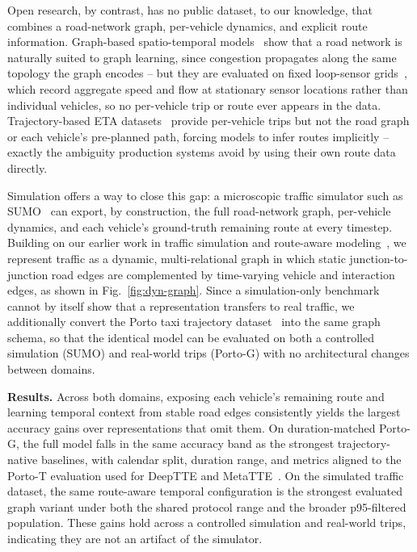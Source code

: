 Open research, by contrast, has no public dataset, to our knowledge, that combines a road-network graph, per-vehicle dynamics, and explicit route information. Graph-based spatio-temporal models~\cite{dcrnn2018,yu2018stgcn,wu2019graphwavenet} show that a road network is naturally suited to graph learning, since congestion propagates along the same topology the graph encodes -- but they are evaluated on fixed loop-sensor grids~\cite{li2018_metrla,pemsbay}, which record aggregate speed and flow at stationary sensor locations rather than individual vehicles, so no per-vehicle trip or route ever appears in the data. Trajectory-based ETA datasets~\cite{nyc_tlc,moreira2013porto,didi2016,zheng2012geolife} provide per-vehicle trips but not the road graph or each vehicle's pre-planned path, forcing models to infer routes implicitly -- exactly the ambiguity production systems avoid by using their own route data directly.

Simulation offers a way to close this gap: a microscopic traffic simulator such as SUMO~\cite{SUMO2018} can export, by construction, the full road-network graph, per-vehicle dynamics, and each vehicle's ground-truth remaining route at every timestep. Building on our earlier work in traffic simulation and route-aware modeling~\cite{voloch2021,SmartSimulativeRoute2025}, we represent traffic as a dynamic, multi-relational graph in which static junction-to-junction road edges are complemented by time-varying vehicle and interaction edges, as shown in Fig.~\ref{fig:dyn-graph}. Since a simulation-only benchmark cannot by itself show that a representation transfers to real traffic, we additionally convert the Porto taxi trajectory dataset~\cite{moreira2013porto} into the same graph schema, so that the identical model can be evaluated on both a controlled simulation (SUMO) and real-world trips (Porto-G) with no architectural changes between domains.

\textbf{Results.} Across both domains, exposing each vehicle's remaining route and learning temporal context from stable road edges consistently yields the largest accuracy gains over representations that omit them. On duration-matched Porto-G, the full model falls in the same accuracy band as the strongest trajectory-native baselines, with calendar split, duration range, and metrics aligned to the Porto-T evaluation used for DeepTTE and MetaTTE~\cite{deepTTE2018,wang2022metatte}. On the simulated traffic dataset, the same route-aware temporal configuration is the strongest evaluated graph variant under both the shared protocol range and the broader p95-filtered population. These gains hold across a controlled simulation and real-world trips, indicating they are not an artifact of the simulator.

